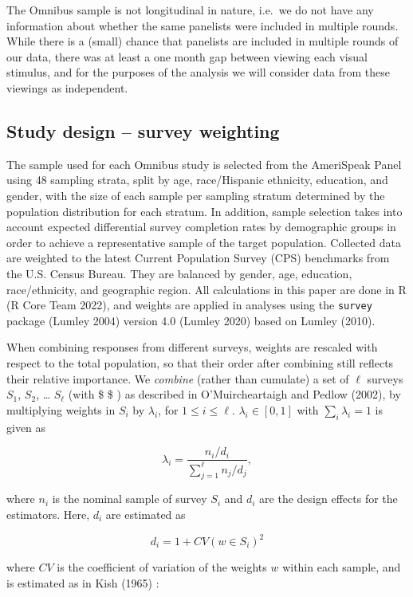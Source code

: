 \documentclass[
]{jds}
\begin{document}
The Omnibus sample is not longitudinal in nature, i.e.~we do not have
any information about whether the same panelists were included in
multiple rounds. While there is a (small) chance that panelists are
included in multiple rounds of our data, there was at least a one month
gap between viewing each visual stimulus, and for the purposes of the
analysis we will consider data from these viewings as independent.

\hypertarget{study-design-survey-weighting}{%
\subsection{Study design -- survey
weighting}\label{study-design-survey-weighting}}

The sample used for each Omnibus study is selected from the AmeriSpeak
Panel using 48 sampling strata, split by age, race/Hispanic ethnicity,
education, and gender, with the size of each sample per sampling stratum
determined by the population distribution for each stratum. In addition,
sample selection takes into account expected differential survey
completion rates by demographic groups in order to achieve a
representative sample of the target population. Collected data are
weighted to the latest Current Population Survey (CPS) benchmarks from
the U.S. Census Bureau. They are balanced by gender, age, education,
race/ethnicity, and geographic region. All calculations in this paper
are done in R (R Core Team 2022), and weights are applied in analyses
using the \texttt{survey} package (Lumley 2004) version 4.0 (Lumley
2020) based on Lumley (2010).

When combining responses from different surveys, weights are rescaled
with respect to the total population, so that their order after
combining still reflects their relative importance. We \emph{combine}
(rather than cumulate) a set of \(\ell\) surveys \(S_1\), \(S_2\),
\ldots{} \(S_\ell\) (with \$ \ell {}\$ ) as described in
O'Muircheartaigh and Pedlow (2002), by multiplying weights in \(S_i\) by
\(\lambda_i\), for \(1 \le i \le \ell\). \(\lambda_i \in [0,1]\) with
\(\sum_i \lambda_i = 1\) is given as

\[
\lambda_i = \frac{n_i/d_i}{\sum_{j=1}^{\ell}n_j/d_j},
\]

where \(n_i\) is the nominal sample of survey \(S_i\) and \(d_i\) are
the design effects for the estimators. Here, \(d_i\) are estimated as

\[
d_i = 1 + CV(w \in S_i)^2
\]

where \(CV\) is the coefficient of variation of the weights \(w\) within
each sample, and is estimated as in Kish (1965) :
\end{document}
